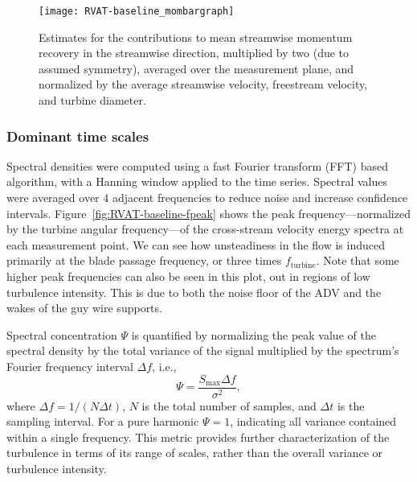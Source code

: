 \begin{figure}
    \centering

    \texttt{[image: RVAT-baseline\_mombargraph]}

    \caption{Estimates for the contributions to mean streamwise momentum
        recovery in the streamwise direction, multiplied by two (due to assumed
        symmetry), averaged over the measurement plane, and normalized by the
        average streamwise velocity, freestream velocity, and turbine diameter.}

    \label{fig:mombargraph}
\end{figure}


\subsubsection{Dominant time scales}

Spectral densities were computed using a fast Fourier transform (FFT) based
algorithm, with a Hanning window applied to the time series. Spectral values
were averaged over 4 adjacent frequencies to reduce noise and increase
confidence intervals. Figure~\ref{fig:RVAT-baseline-fpeak} shows the peak
frequency---normalized by the turbine angular frequency---of the cross-stream
velocity energy spectra at each measurement point. We can see how unsteadiness
in the flow is induced primarily at the blade passage frequency, or three times
$f_\mathrm{turbine}$. Note that some higher peak frequencies can also be seen in
this plot, out in regions of low turbulence intensity. This is due to both the
noise floor of the ADV and the wakes of the guy wire supports.

Spectral concentration $\Psi$ is quantified by normalizing the peak value of the
spectral density by the total variance of the signal multiplied by the
spectrum's Fourier frequency interval $\Delta f$, i.e.,
\begin{equation}
    \Psi = \frac{S_{\max} \Delta f}{\sigma^2},
    \label{eq:spectral-concentration}
\end{equation}
where $\Delta f = 1/(N \Delta t)$, $N$ is the total number of samples, and
$\Delta t$ is the sampling interval. For a pure harmonic $\Psi = 1$, indicating
all variance contained within a single frequency. This metric provides further
characterization of the turbulence in terms of its range of scales, rather than
the overall variance or turbulence intensity.

